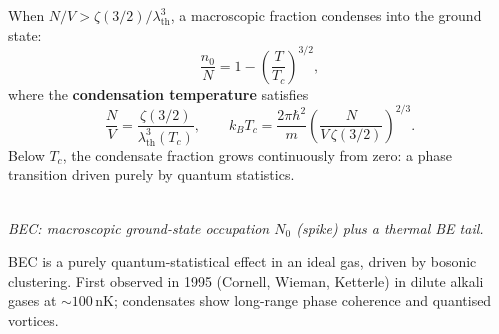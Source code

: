 \begin{fact}
When $N/V > \zeta(3/2)/\lambda_\text{th}^3$, a macroscopic fraction condenses
into the ground state:
\begin{equation}
    \frac{n_0}{N} = 1 - \left(\frac{T}{T_c}\right)^{3/2},
\end{equation}
where the \textbf{condensation temperature} satisfies
\begin{equation}
    \frac{N}{V} = \frac{\zeta(3/2)}{\lambda_\text{th}^3(T_c)},
    \qquad
    k_BT_c = \frac{2\pi\hbar^2}{m}\!\left(\frac{N}{V\,\zeta(3/2)}\right)^{\!2/3}.
\end{equation}
Below $T_c$, the condensate fraction grows continuously from zero: a phase
transition driven purely by quantum statistics.
\end{fact}

\begin{center}
\\[3pt]
{\small\itshape BEC: macroscopic ground-state occupation $N_0$ (spike) plus a thermal BE tail.}
\end{center}

BEC is a purely quantum-statistical effect in an ideal gas, driven by bosonic clustering. First observed in 1995 (Cornell, Wieman, Ketterle) in dilute alkali gases at $\sim 100\,\text{nK}$; condensates show long-range phase coherence and quantised vortices.
